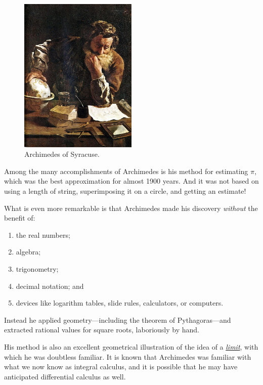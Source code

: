 \documentclass[
  a4paper,
]{article}
\begin{document}
\begin{figure}
\centering
\includegraphics[width=0.5\textwidth,height=\textheight]{images/Domenico-Fetti_Archimedes_1620.jpg}
\caption[Archimedes of Syracuse.]{Archimedes of
Syracuse.\footnotemark{}}\label{fig:archimedes}
\end{figure}

Among the many accomplishments of Archimedes is his method for
estimating \(\pi\), which was the best approximation for almost 1900
years. And it was not based on using a length of string, superimposing
it on a circle, and getting an estimate! \normalfont 

What is even more remarkable is that Archimedes made his discovery
\emph{without} the benefit of:

\begin{enumerate}
\def\labelenumi{(\alph{enumi})}
\item
  the real numbers;
\item
  algebra;
\item
  trigonometry;
\item
  decimal notation; and
\item
  devices like logarithm tables, slide rules, calculators, or computers.
\end{enumerate}

Instead he applied geometry---including the theorem of Pythagoras---and
extracted rational values for square roots, laboriously by hand.

His method is also an excellent geometrical illustration of the idea of
a
\href{https://www.britannica.com/science/limit-mathematics}{\emph{limit}},
with which he was doubtless familiar. It is known that Archimedes was
familiar with what we now know as integral calculus, and it is possible
that he may have anticipated differential calculus as well.
\end{document}
